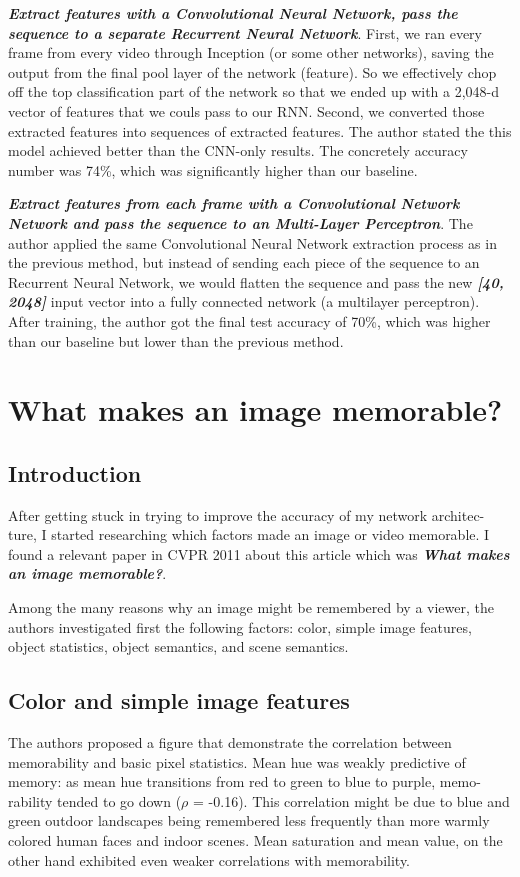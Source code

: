 \textbf{\emph{Extract features with a Convolutional Neural Network, pass the sequence to a separate Recurrent Neural Network}}. First, we ran every frame from every video through Inception (or some other networks), saving the output from the final pool layer of the network (feature). So we effectively chop off the top classification part of the network so that we ended up with a 2,048-d vector of features that we couls pass to our RNN. Second, we converted those extracted features into sequences of extracted features. The author stated the this model achieved better than the CNN-only results. The concretely accuracy number was 74\%, which was significantly higher than our baseline.

\textbf{\emph{Extract features from each frame with a Convolutional Network Network and pass the sequence to an Multi-Layer Perceptron}}. The author applied the same Convolutional Neural Network extraction process as in the previous method, but instead of sending each piece of the sequence to an Recurrent Neural Network, we would flatten the sequence and pass the new \textbf{\emph{[40, 2048]}} input vector into a fully connected network (a multilayer perceptron). After training, the author got the final test accuracy of 70\%, which was higher than our baseline but lower than the previous method.

\section{What makes an image memorable?}
\subsection{Introduction}
After getting stuck in trying to improve the accuracy of my network architec-ture, I started researching which factors made an image or video memorable. I found a relevant paper in CVPR 2011 about this article which was \textbf{\emph{What makes an image memorable?}}\cite{imagememorable}.

Among the many reasons why an image might be remembered by a viewer, the authors investigated first the following factors: color, simple image features, object statistics, object semantics, and scene semantics.

\subsection{Color and simple image features}
The authors proposed a figure that demonstrate the correlation between memorability and basic pixel statistics. Mean hue was weakly predictive of memory: as mean hue transitions from red to green to blue to purple, memo-rability tended to go down ($\rho$ = -0.16). This correlation might be due to blue and green outdoor landscapes being remembered less frequently than more warmly colored human faces and indoor scenes. Mean saturation and mean value, on the other hand exhibited even weaker correlations with memorability. 

